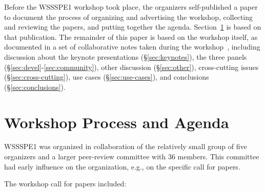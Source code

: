 \documentclass[11pt, oneside]{amsart}
\begin{document}
Before the WSSSPE1 workshop took place, the organizers self-published
a paper~\cite{WSSSPE1-pre-report} to document the process of
organizing and advertising the workshop, collecting and reviewing the
papers, and putting together the agenda. Section~\ref{sec:process} is
based on that publication. The remainder of this paper is based on the
workshop itself, as documented in a set of collaborative notes taken
during the workshop~\cite{WSSSPE1-google-notes}, including discussion
about the keynote presentations (\S\ref{sec:keynotes}), the three
panels (\S\ref{sec:devel}-\ref{sec:community}), other discussion
(\S\ref{sec:other}), cross-cutting issues (\S\ref{sec:cross-cutting}),
use cases (\S\ref{sec:use-cases}), and conclusions
(\S\ref{sec:conclusions}).

\section{Workshop Process and Agenda} \label{sec:process}

WSSSPE1 was organized in collaboration of the relatively small group
of five organizers and a larger peer-review committee with 36
members. This committee had early influence on the organization, e.g.,
on the specific call for papers.

The workshop call for papers included:
\end{document}
